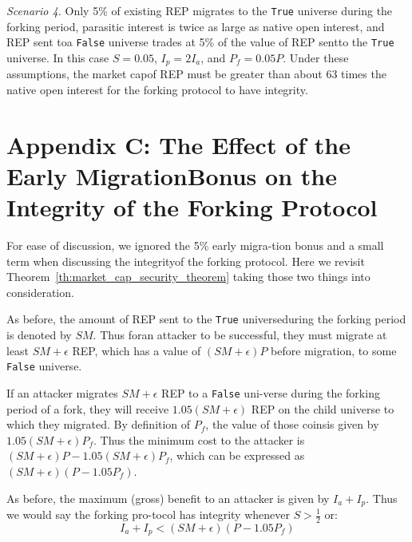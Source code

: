 \documentclass[12pt,floatfix,reprint,nofootinbib,amsmath,amssymb,epsfig,pre,floats,letterpaper,groupedaffiliation]{revtex4-1}
\theoremstyle{definition}
\theoremstyle{definition}
\begin{document}
\textit{Scenario 4.} Only 5\% of existing REP migrates to the \texttt{True} universe during the forking period, parasitic interest is twice as large as native open interest, and REP sent to\pagebreak \linebreak a \texttt{False} universe trades at 5\% of the value of REP sent\linebreak to the \texttt{True} universe. In this case $S = 0.05$, $I_p = 2I_a$, and $P_f = 0.05P$. Under these assumptions, the market cap\linebreak of REP must be greater than about 63 times the native open interest for the forking protocol to have integrity.

\section*{Appendix C: The Effect of the Early Migration\linebreak Bonus   on the Integrity of the Forking Protocol}

For ease of discussion, we ignored the 5\% early migra-\linebreak tion bonus and a small term when discussing the integrity\linebreak of the forking protocol. Here we revisit Theorem~\ref{th:market_cap_security_theorem} taking those two things into consideration.

As before, the amount of REP sent to the \texttt{True} universe\linebreak during the forking period is denoted by $SM$. Thus for\linebreak an attacker to be successful, they must migrate at least $SM + \epsilon$ REP, which has a value of $(SM + \epsilon)P$ before migration, to some \texttt{False} universe.

If an attacker migrates $SM + \epsilon$ REP to a \texttt{False} uni-\linebreak verse during the forking period of a fork, they will receive $1.05(SM + \epsilon)$ REP on the child universe to which they migrated. By definition of $P_f$, the value of those coins\linebreak is given by $1.05(SM + \epsilon)P_f$. Thus the minimum cost to the attacker is $(SM + \epsilon)P - 1.05(SM + \epsilon)P_f$, which can be expressed as $(SM + \epsilon)(P - 1.05P_f)$.

As before, the maximum (gross) benefit to an attacker is given by $I_a + I_p$. Thus we would say the forking pro-\linebreak tocol has integrity whenever $S > \frac{1}{2}$ or:
\[
I_a + I_p < (SM + \epsilon)(P - 1.05P_f)\tag{C1}
\]
\end{document}
